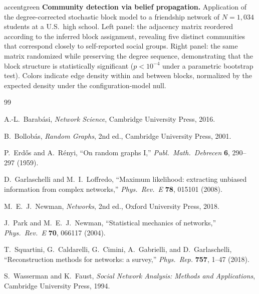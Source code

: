 \begin{colorplate}{accentgreen}
{\bfseries Community detection via belief propagation.} Application of the degree-corrected stochastic block model to a friendship network of $N = 1{,}034$ students at a U.S.\ high school. Left panel: the adjacency matrix reordered according to the inferred block assignment, revealing five distinct communities that correspond closely to self-reported social groups. Right panel: the same matrix randomized while preserving the degree sequence, demonstrating that the block structure is statistically significant ($p < 10^{-4}$ under a parametric bootstrap test). Colors indicate edge density within and between blocks, normalized by the expected density under the configuration-model null.
\end{colorplate}

\begin{thebibliography}{99}

A.-L.\ Barab\'{a}si,
\textit{Network Science},
Cambridge University Press, 2016.

B.\ Bollob\'{a}s,
\textit{Random Graphs}, 2nd ed.,
Cambridge University Press, 2001.

P.\ Erd\H{o}s and A.\ R\'{e}nyi,
``On random graphs I,''
\textit{Publ.\ Math.\ Debrecen} \textbf{6}, 290--297 (1959).

D.\ Garlaschelli and M.\ I.\ Loffredo,
``Maximum likelihood: extracting unbiased information from complex networks,''
\textit{Phys.\ Rev.\ E} \textbf{78}, 015101 (2008).

M.\ E.\ J.\ Newman,
\textit{Networks}, 2nd ed.,
Oxford University Press, 2018.

J.\ Park and M.\ E.\ J.\ Newman,
``Statistical mechanics of networks,''
\textit{Phys.\ Rev.\ E} \textbf{70}, 066117 (2004).

T.\ Squartini, G.\ Caldarelli, G.\ Cimini, A.\ Gabrielli, and D.\ Garlaschelli,
``Reconstruction methods for networks: a survey,''
\textit{Phys.\ Rep.} \textbf{757}, 1--47 (2018).

S.\ Wasserman and K.\ Faust,
\textit{Social Network Analysis: Methods and Applications},
Cambridge University Press, 1994.

\end{thebibliography}

\printindex
